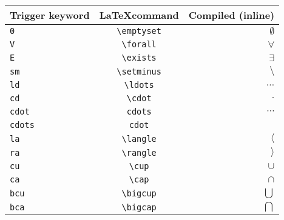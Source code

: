 \documentclass[a4paper,11pt]{scrartcl}
\numberwithin{equation}{section}
\begin{document}
\thispagestyle{plain}
\begin{table}[tb]
  \begin{center}
    \begin{tabular}{lcr}
    \hline
    \multicolumn{1}{c}{\bf Trigger keyword}    &    \multicolumn{1}{c}{\bf \LaTeX command}    &    \multicolumn{1}{c}{\bf Compiled (inline)}   \\
    \hline
    \verb|0|                                   &    \verb|\emptyset|                          &    $\emptyset$  \\
    \verb|V|                                   &    \verb|\forall|                            &    $\forall$  \\
    \verb|E|                                   &    \verb|\exists|                            &    $\exists$  \\
    \verb|sm|                                  &    \verb|\setminus|                          &    $\setminus$  \\
    \verb|ld|                                  &    \verb|\ldots|                             &    $\ldots$  \\
    \verb|cd|                                  &    \verb|\cdot|                              &    $\cdot$  \\
    \verb|cdot|                                &    \verb|cdots|                              &    $\cdots$  \\
    \verb|cdots|                               &    \verb|cdot|                               &    $\mbox{}$  \\
    \verb|la|                                  &    \verb|\langle|                            &    $\langle$  \\
    \verb|ra|                                  &    \verb|\rangle|                            &    $\rangle$  \\
    \verb|cu|                                  &    \verb|\cup|                               &    $\cup$  \\
    \verb|ca|                                  &    \verb|\cap|                               &    $\cap$  \\
    \verb|bcu|                                 &    \verb|\bigcup|                            &    $\bigcup$  \\
    \verb|bca|                                 &    \verb|\bigcap|                            &    $\bigcap$  \\

\end{tabular}
\end{center}
\end{table}
\end{document}
